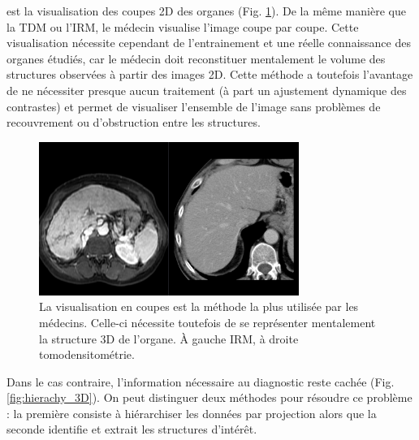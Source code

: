      est la visualisation des coupes 2D des organes (Fig. \ref{fig:slice_visualization}). De la même manière que la TDM ou l'IRM, le médecin visualise l'image coupe par coupe. Cette visualisation nécessite cependant de l'entrainement et une réelle connaissance des organes étudiés, car le médecin doit reconstituer mentalement le volume des structures observées à partir des images 2D. Cette méthode a toutefois l'avantage de ne nécessiter presque aucun traitement (à part un ajustement dynamique des contrastes) et permet de visualiser l'ensemble de l'image sans problèmes de recouvrement ou d'obstruction entre les structures. 

    \begin{figure}[!ht]
      \centering
      \includegraphics[height=5cm]{Images/2D_view.png}
      \caption{La visualisation en coupes est la méthode la plus utilisée par les médecins. Celle-ci nécessite toutefois de se représenter mentalement la structure 3D de l'organe. À gauche IRM, à droite tomodensitométrie.}
      \label{fig:slice_visualization}
    \end{figure}

     Dans le cas contraire, l'information nécessaire au diagnostic reste cachée (Fig. \ref{fig:hierachy_3D}). On peut distinguer deux méthodes pour résoudre ce problème : la première consiste à hiérarchiser les données par projection alors que la seconde identifie et extrait les structures d'intérêt.
    
